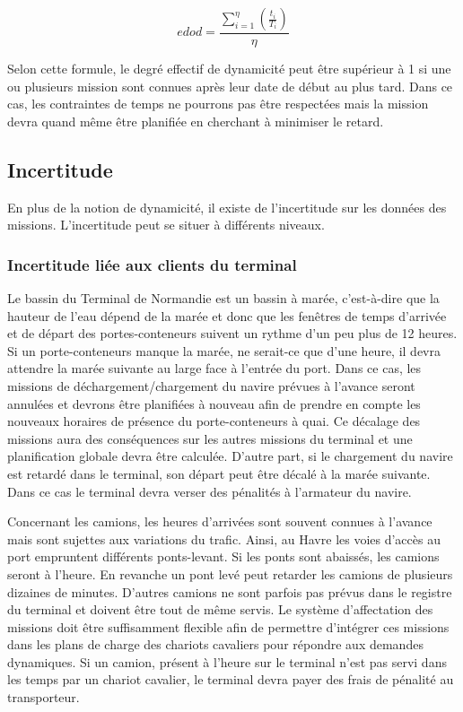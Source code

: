 \begin{equation}
 edod = \frac{\sum \limits_{i=1}^{\eta}\left( \frac{t_i}{T_i} \right)}{\eta}
\end{equation}

Selon cette formule, le degré effectif de dynamicité peut être supérieur à 1 si une ou plusieurs mission sont connues après leur date de début au plus tard. Dans ce cas, les contraintes de temps ne pourrons pas être respectées mais la mission devra quand même être planifiée en cherchant à minimiser le retard.


\subsection{Incertitude}
En plus de la notion de dynamicité, il existe de l'incertitude sur les données des missions. L'incertitude peut se situer à différents niveaux.

\subsubsection{Incertitude liée aux clients du terminal}

Le bassin du Terminal de Normandie est un bassin à marée, c'est-à-dire que la hauteur de l'eau dépend de la marée et donc que les fenêtres de temps d'arrivée et de départ des portes-conteneurs suivent un rythme d'un peu plus de 12 heures.
Si un porte-conteneurs manque la marée, ne serait-ce que d'une heure, il devra attendre la marée suivante au large face à l'entrée du port. Dans ce cas, les missions de déchargement/chargement du navire prévues à l'avance seront annulées et devrons être planifiées à nouveau afin de prendre en compte les nouveaux horaires de présence du porte-conteneurs à quai. Ce décalage des missions aura des conséquences sur les autres missions du terminal et une planification globale devra être calculée.
D'autre part, si le chargement du navire est retardé dans le terminal, son départ peut être décalé à la marée suivante. Dans ce cas le terminal devra verser des pénalités à l'armateur du navire.

Concernant les camions, les heures d'arrivées sont souvent connues à l'avance mais sont sujettes aux variations du trafic. Ainsi, au Havre les voies d'accès au port empruntent différents ponts-levant. Si les ponts sont abaissés, les camions seront à l'heure. En revanche un pont levé peut retarder les camions de plusieurs dizaines de minutes. D'autres camions ne sont parfois pas prévus dans le registre du terminal et doivent être tout de même servis. Le système d'affectation des missions doit être suffisamment flexible afin de permettre d'intégrer ces missions dans les plans de charge des chariots cavaliers pour répondre aux demandes dynamiques.
Si un camion, présent à l'heure sur le terminal n'est pas servi dans les temps par un chariot cavalier, le terminal devra payer des frais de pénalité au transporteur.

